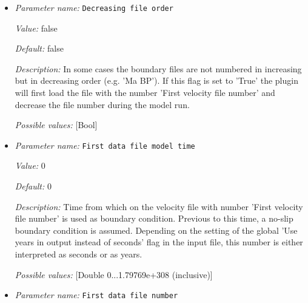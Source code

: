 \begin{itemize}
{\it Value:} 1e6


{\it Default:} 1e6


{\it Description:} Time step between following velocity files. Depending on the setting of the global 'Use years in output instead of seconds' flag in the input file, this number is either interpreted as seconds or as years. The default is one million, i.e., either one million seconds or one million years.


{\it Possible values:} [Double 0...1.79769e+308 (inclusive)]
\item {\it Parameter name:} {\tt Decreasing file order}
\label{parameters:Boundary composition model/Ascii data model/Decreasing file order}


{\it Value:} false


{\it Default:} false


{\it Description:} In some cases the boundary files are not numbered in increasing but in decreasing order (e.g. 'Ma BP'). If this flag is set to 'True' the plugin will first load the file with the number 'First velocity file number' and decrease the file number during the model run.


{\it Possible values:} [Bool]
\item {\it Parameter name:} {\tt First data file model time}
\label{parameters:Boundary composition model/Ascii data model/First data file model time}


{\it Value:} 0


{\it Default:} 0


{\it Description:} Time from which on the velocity file with number 'First velocity file number' is used as boundary condition. Previous to this time, a no-slip boundary condition is assumed. Depending on the setting of the global 'Use years in output instead of seconds' flag in the input file, this number is either interpreted as seconds or as years.


{\it Possible values:} [Double 0...1.79769e+308 (inclusive)]
\item {\it Parameter name:} {\tt First data file number}
\label{parameters:Boundary composition model/Ascii data model/First data file number}



\end{itemize}
